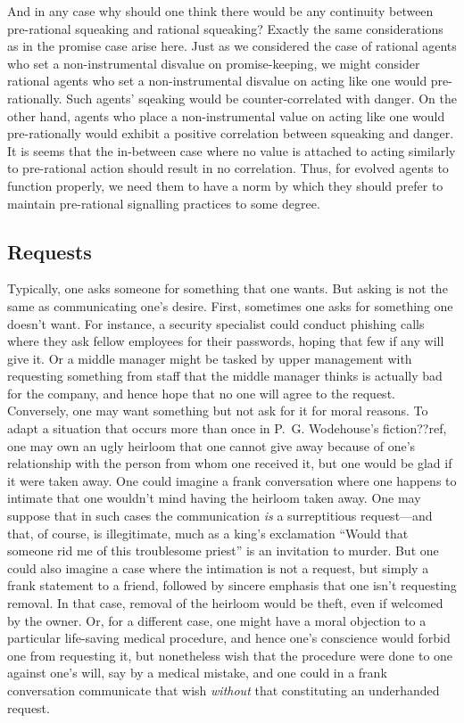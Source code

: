 And in any case why should one think there would be any continuity between pre-rational squeaking and rational squeaking?
Exactly the same considerations as in the promise case arise here. Just as we considered the case of rational
agents who set a non-instrumental disvalue on promise-keeping, we might consider rational agents who set a
non-instrumental disvalue on acting like one would pre-rationally. Such agents' sqeaking would be counter-correlated
with danger. On the other hand, agents who place a non-instrumental value on acting like one would pre-rationally would
exhibit a positive correlation between squeaking and danger. It is seems that the in-between case where
no value is attached to acting similarly to pre-rational action should result in no correlation. Thus, for evolved
agents to function properly, we need them to have a norm by which they should prefer to maintain pre-rational 
signalling practices to some degree. 

\subsection{Requests}
Typically, one asks someone for something that one wants. But asking is not the same as communicating one's desire. First,
sometimes one asks for something one doesn't want. For instance, a security specialist could conduct phishing calls where they
ask fellow employees for their passwords, hoping that few if any will give it. Or a middle manager might be tasked by upper
management with requesting something from staff that the middle manager thinks is actually bad for the company, and hence hope
that no one will agree to the request. Conversely, one may want something but not ask for it for moral reasons. To adapt a 
situation that occurs more than once in P.~G. Wodehouse's fiction??ref, one may own an ugly heirloom that one cannot give away because 
of one's relationship with the person from whom one received it, but one would be glad if it were taken away. One could imagine
a frank conversation where one happens to intimate that one wouldn't mind having the heirloom taken away. One may suppose that
in such cases the communication \textit{is} a surreptitious request---and that, of course, is illegitimate, much as a king's
exclamation ``Would that someone rid me of this troublesome priest'' is an invitation to murder. But one could also imagine
a case where the intimation is not a request, but simply a frank statement to a friend, followed by sincere emphasis that one isn't
requesting removal. In that case, removal of the heirloom would be theft, even if welcomed by the owner. Or, for a
different case, one might have a moral objection to a particular life-saving medical procedure, and hence one's conscience would
forbid one from requesting it, but nonetheless wish that the procedure were done to one against one's will, say by a medical
mistake, and one could in a frank conversation communicate that wish \textit{without} that constituting an underhanded request.

